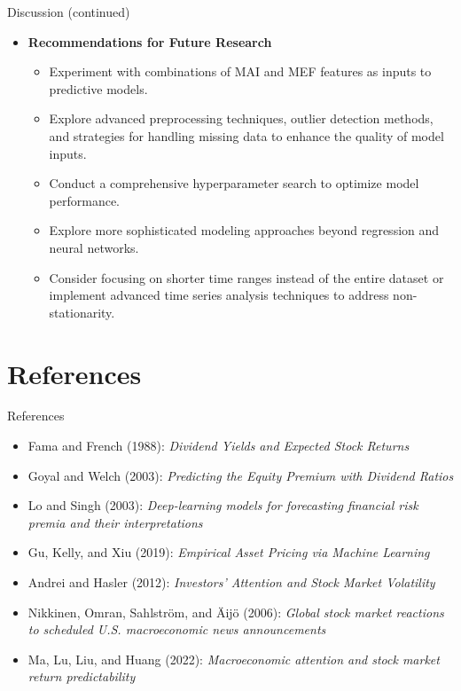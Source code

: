 \documentclass{beamer}
\begin{document}
\begin{frame}{Discussion (continued)}
  \begin{itemize}
    \item \textbf{Recommendations for Future Research} 
    \begin{itemize}
        \item Experiment with combinations of MAI and MEF features as inputs to predictive models.
        \item Explore advanced preprocessing techniques, outlier detection methods, and strategies for handling missing data to enhance the quality of model inputs.
        \item Conduct a comprehensive hyperparameter search to optimize model performance.
        \item Explore more sophisticated modeling approaches beyond regression and neural networks.
        \item Consider focusing on shorter time ranges instead of the entire dataset or implement advanced time series analysis techniques to address non-stationarity.
    \end{itemize}
  \end{itemize}
\end{frame}

\section{References}
\begin{frame}{References}
  \begin{itemize}
    \item Fama and French (1988): \emph{Dividend Yields and Expected Stock Returns}
    \item Goyal and Welch (2003): \emph{Predicting the Equity Premium with Dividend Ratios}
    \item Lo and Singh (2003): \emph{Deep-learning models for forecasting financial risk premia and their interpretations}
    \item Gu, Kelly, and Xiu (2019): \emph{Empirical Asset Pricing via Machine Learning}
    \item Andrei and Hasler (2012): \emph{Investors’ Attention and Stock Market Volatility}
    \item Nikkinen, Omran, Sahlström, and Äijö (2006): \emph{Global stock market reactions to scheduled U.S. macroeconomic news announcements}
    \item Ma, Lu, Liu, and Huang (2022): \emph{Macroeconomic attention and stock market return predictability}
  \end{itemize}
\end{frame}
\end{document}
